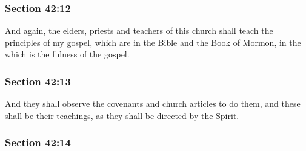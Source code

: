 
	\subsubsection{Section 42:12} %
		\label{DC42-12}

		And again, the elders, priests and teachers of this church shall teach the principles of my gospel, which are in the Bible and the Book of Mormon, in the which is the fulness of the gospel.


	\subsubsection{Section 42:13} %
		\label{DC42-13}

		And they shall observe the covenants and church articles to do them, and these shall be their teachings, as they shall be directed by the Spirit.


	\subsubsection{Section 42:14} %
		\label{DC42-14}

